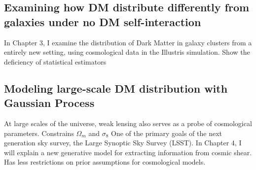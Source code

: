 \documentclass[ucdthesis.tex]{subfiles}
\begin{document}
		\subsection{Examining how DM distribute differently from galaxies under no
		DM self-interaction}
		In Chapter 3, I examine the distribution of Dark Matter in galaxy clusters
		from a entirely new setting, using cosmological data in the Illustris
		simulation. Show the deficiency of statistical estimators 

		\subsection{Modeling large-scale DM distribution with Gaussian Process}
		At large scales of the universe, weak lensing also serves as a probe of 
		cosmological parameters. Constrains $\Omega_m$ and $\sigma_8$ 
		One of the primary goals of the next generation sky survey, the Large
		Synoptic Sky Survey (LSST). In Chapter 4, I will explain a new generative
		model for extracting information from cosmic shear. 
	  Has less restrictions on prior assumptions for cosmological models.	


        
	  {}
\end{document}
